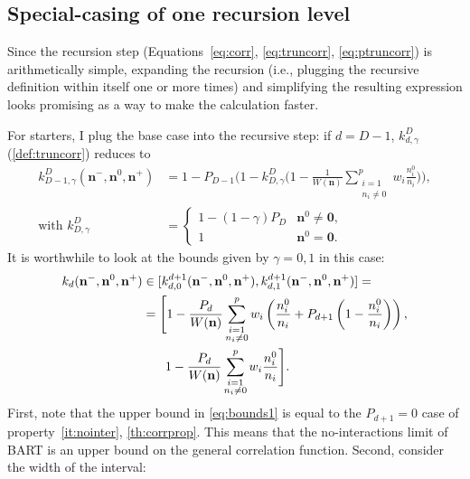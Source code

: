 \documentclass[a4paper]{article}
\newcommand{\nvecs}{\mathbf n^-, \mathbf n^0, \mathbf n^+}
\theoremstyle{definition}
\begin{document}
    \subsection{Special-casing of one recursion level}

    Since the recursion step (Equations~\ref{eq:corr}, \ref{eq:truncorr}, \ref{eq:ptruncorr}) is arithmetically simple, expanding the recursion (i.e., plugging the recursive definition within itself one or more times) and simplifying the resulting expression looks promising as a way to make the calculation faster.
    
    For starters, I plug the base case into the recursive step: if $d = D - 1$, $k^D_{d,\gamma}$ (\autoref{def:truncorr}) reduces to
    \begin{align}
        k^D_{D-1,\gamma}(\nvecs) &= 1 - P_{D-1} \Bigg(
            1 - k^D_{D,\gamma} \Bigg(1 -
            \frac 1 {W(\mathbf n)}
            \sum_{\substack{i=1 \\ n_i\ne 0}}^p
            w_i \frac{n^0_i}{n_i} \Bigg)
        \Bigg), \label{eq:depth1} \\
        \text{with } k^D_{D,\gamma} &= \begin{cases}
            1 - (1 - \gamma) P_D & \mathbf n^0 \ne \mathbf 0, \\
            1                    & \mathbf n^0   = \mathbf 0.
        \end{cases}
    \end{align}
    It is worthwhile to look at the bounds given by $\gamma = 0, 1$ in this case:
    \begin{align}
        k_d(\nvecs) &\in [k^{d+1}_{d,0}(\nvecs), k^{d+1}_{d,1}(\nvecs)] = \notag \\
        &= \Bigg[
            1 - \frac{P_d}{W(\mathbf n)}
            \sum_{\substack{i=1 \\ n_i \ne 0}}^p
            w_i \left(
                \frac{n^0_i}{n_i} + P_{d+1} \left( 1 - \frac{n^0_i}{n_i} \right)
            \right), \notag \\
            &\phantom{{} \in \Bigg[}
            1 - \frac{P_d}{W(\mathbf n)}
            \sum_{\substack{i=1 \\ n_i \ne 0}}^p
            w_i \frac{n^0_i}{n_i}
        \Bigg]. \label{eq:bounds1}
    \end{align}
    First, note that the upper bound in \autoref{eq:bounds1} is equal to the $P_{d+1} = 0$ case of property~\ref{it:nointer}, \autoref{th:corrprop}. This means that the no-interactions limit of BART is an upper bound on the general correlation function. Second, consider the width of the interval:
\end{document}
